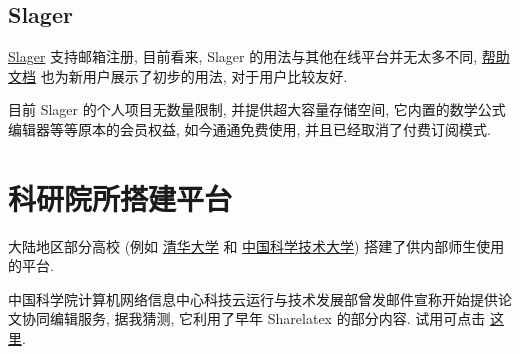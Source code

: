 \subsection{Slager}

\href{https://www.slager.link/#/Home}{Slager}%
支持邮箱注册,
目前看来,
Slager 的用法与其他在线平台并无太多不同,
\href{https://www.slager.link/#/HelpCenter}{帮助文档}%
也为新用户展示了初步的用法,
对于用户比较友好.

目前 Slager 的个人项目无数量限制,
并提供超大容量存储空间,
它内置的数学公式编辑器等等原本的会员权益,
如今通通免费使用,
并且已经取消了付费订阅模式.

\section{科研院所搭建平台}

大陆地区部分高校 (例如%
\href{https://overleaf.tsinghua.edu.cn/login}{清华大学}%
和%
\href{https://latex.ustc.edu.cn/login}{中国科学技术大学}) 搭建了供内部师生使用的平台.

中国科学院计算机网络信息中心科技云运行与技术发展部曾发邮件宣称开始提供论文协同编辑服务,
据我猜测,
它利用了早年 Sharelatex 的部分内容.
试用可点击%
\href{https://www.cstcloud.cn/resources/452}{这里}.
